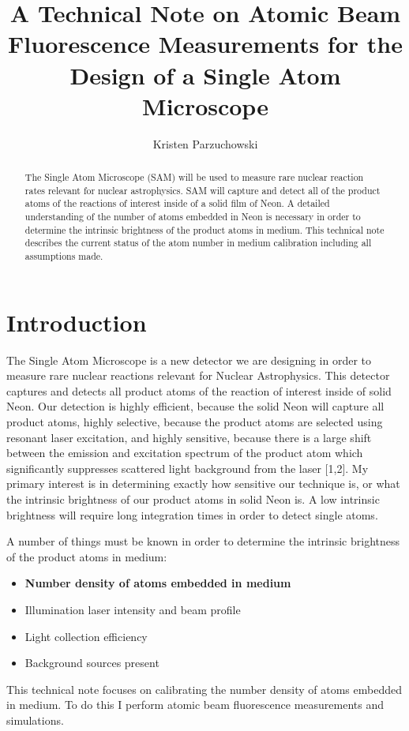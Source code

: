 \documentclass[12pt, a4paper]{article}
\title{A Technical Note on Atomic Beam Fluorescence Measurements for the Design of a Single Atom Microscope}
\author{Kristen Parzuchowski}
\begin{document}
\maketitle
\begin{abstract}
The Single Atom Microscope (SAM) will be used to measure rare nuclear reaction rates relevant for nuclear astrophysics. SAM will capture and detect all of the product atoms of the reactions of interest inside of a solid film of Neon. A detailed understanding of the number of atoms embedded in Neon is necessary in order to determine the intrinsic brightness of the product atoms in medium. This technical note describes the current status of the atom number in medium calibration including all assumptions made.
\end{abstract}
\section{Introduction}
The Single Atom Microscope is a new detector we are designing in order to measure rare nuclear reactions relevant for Nuclear Astrophysics. This detector captures and detects all product atoms of the reaction of interest inside of solid Neon. Our detection is highly efficient, because the solid Neon will capture all product atoms, highly selective, because the product atoms are selected using resonant laser excitation, and highly sensitive, because there is a large shift between the emission and excitation spectrum of the product atom which significantly suppresses scattered light background from the laser [1,2]. My primary interest is in determining exactly how sensitive our technique is, or what the intrinsic brightness of our product atoms in solid Neon is. A low intrinsic brightness will require long integration times in order to detect single atoms. 

A number of things must be known in order to determine the intrinsic brightness of the product atoms in medium:
\begin{itemize}
\item \textbf{Number density of atoms embedded in medium}
\item Illumination laser intensity and beam profile
\item Light collection efficiency
\item Background sources present
\end{itemize}
This technical note focuses on calibrating the number density of atoms embedded in medium. To do this I perform atomic beam fluorescence measurements and simulations. 
\end{document}

